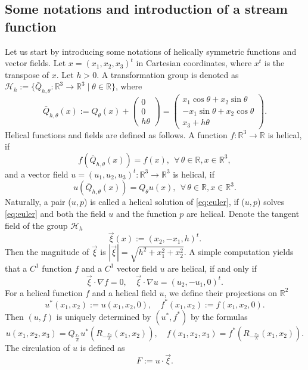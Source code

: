 \documentclass[12pt,reqno]{amsart}
\numberwithin{equation}{section}
\theoremstyle{definition}
\theoremstyle{remark}
\begin{document}
\subsection{Some notations and introduction of a stream function}
Let us start by introducing some notations of helically symmetric functions and vector fields. Let $ x=(x_1,x_2,x_3)^t $ in Cartesian coordinates, where $ x^t $ is the transpose of   $ x $. 
Let $ h>0 $. A transformation group is denoted as  $ \mathcal{H}_h:=\{\bar{Q}_{h,\theta}:\mathbb{R}^3\to\mathbb{R}^3\mid  \theta\in\mathbb{R}\} $, where
\begin{equation*}
\bar{Q}_{h,\theta}(x):=Q_\theta(x)+\begin{pmatrix}
0  \\
0  \\ 
h\theta
\end{pmatrix}=\begin{pmatrix}
x_1\cos\theta+x_2\sin\theta  \\
-x_1\sin\theta +x_2\cos\theta  \\ 
x_3+h\theta
\end{pmatrix}.
\end{equation*}	
Helical functions and fields are defined as follows.  A function $f:\mathbb R^3\rightarrow\mathbb R $ is  helical, if $$ f(\bar{Q}_{h,\theta}(x))=f(x),  \ \ \forall\, \theta\in\mathbb{R}, x\in \mathbb R^3, $$
and a vector field $ u=(u_1,u_2,u_3)^t:\mathbb R^3\rightarrow\mathbb R^3$ is   helical, if $$ u(\bar{Q}_{h,\theta}(x))= Q_{\theta} u(x),\ \ \forall\, \theta\in\mathbb{R}, x\in \mathbb{R}^3. $$
Naturally, a   pair ($u, p$) is called a helical solution  of \eqref{eq:euler},  if ($u, p$) solves \eqref{eq:euler} and both the field $ u $ and the function $ p  $ are helical. 
Denote the tangent field of the group $ \mathcal{H}_h $
\begin{equation*}%
\vec{\xi}(x):= (x_2, -x_1, h)^t.
\end{equation*}
Then the magnitude  of $ \vec{\xi} $ is $ |\vec{\xi}|=\sqrt{h^2+x_1^2+x_2^2} $. A simple computation yields that   a $ C^1 $   function $f$ and a $ C^1 $ vector field  $u$ are  helical, if and only if $$\vec{\xi}\cdot \nabla f=0,\quad \vec{\xi}\cdot \nabla  u=(u_2,-u_1,0)^t.$$
For a helical function $ f $ and a helical field $ u $, we define their projections on $ \mathbb{R}^2 $
$$u^*(x_1,x_2):=u(x_1,x_2,0), \quad f^*(x_1,x_2):=f(x_1,x_2,0).$$
Then $ (u,f) $ is uniquely determined by $ (u^*,f^*) $ by the formulas
$$ u(x_1,x_2,x_3)=Q_{\frac{x_3}{h}}u^*\left (R_{-\frac{x_3}{h}}(x_1,x_2)\right ),\quad f(x_1,x_2,x_3)= f^*\left (R_{-\frac{x_3}{h}}(x_1,x_2)\right ). $$
The circulation of $ u $  is defined as 
\begin{equation*} 
F :=u \cdot \vec{\xi}.
\end{equation*} 
\end{document}
